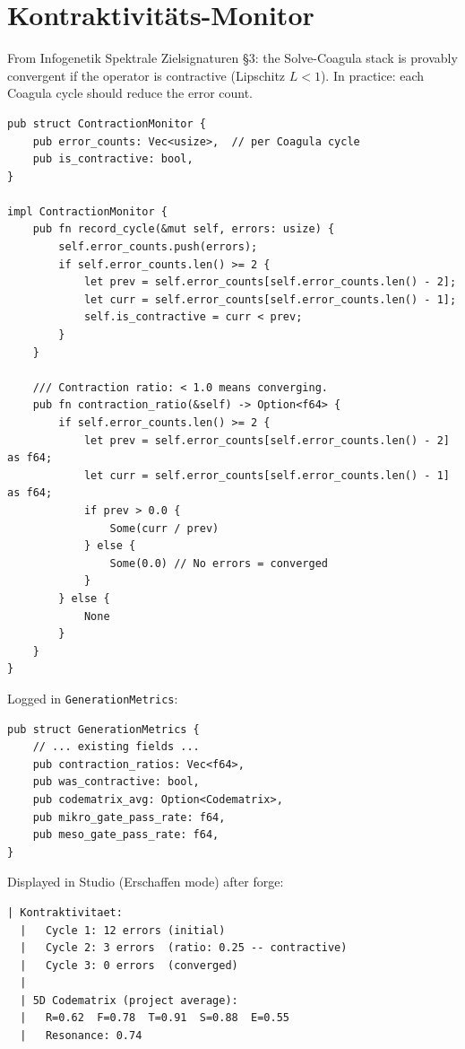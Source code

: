 \documentclass[11pt,a4paper]{article}
\begin{document}
\section{Kontraktivit\"ats-Monitor}
\label{sec:contraction}

From Infogenetik Spektrale Zielsignaturen \S3: the Solve-Coagula 
stack is provably convergent if the operator is contractive 
(Lipschitz $L < 1$). In practice: each Coagula cycle should 
reduce the error count.

\begin{lstlisting}[style=rust]
pub struct ContractionMonitor {
    pub error_counts: Vec<usize>,  // per Coagula cycle
    pub is_contractive: bool,
}

impl ContractionMonitor {
    pub fn record_cycle(&mut self, errors: usize) {
        self.error_counts.push(errors);
        if self.error_counts.len() >= 2 {
            let prev = self.error_counts[self.error_counts.len() - 2];
            let curr = self.error_counts[self.error_counts.len() - 1];
            self.is_contractive = curr < prev;
        }
    }
    
    /// Contraction ratio: < 1.0 means converging.
    pub fn contraction_ratio(&self) -> Option<f64> {
        if self.error_counts.len() >= 2 {
            let prev = self.error_counts[self.error_counts.len() - 2] as f64;
            let curr = self.error_counts[self.error_counts.len() - 1] as f64;
            if prev > 0.0 {
                Some(curr / prev)
            } else {
                Some(0.0) // No errors = converged
            }
        } else {
            None
        }
    }
}
\end{lstlisting}

Logged in \texttt{GenerationMetrics}:

\begin{lstlisting}[style=rust]
pub struct GenerationMetrics {
    // ... existing fields ...
    pub contraction_ratios: Vec<f64>,
    pub was_contractive: bool,
    pub codematrix_avg: Option<Codematrix>,
    pub mikro_gate_pass_rate: f64,
    pub meso_gate_pass_rate: f64,
}
\end{lstlisting}

Displayed in Studio (Erschaffen mode) after forge:

\begin{lstlisting}[style=bash]
  | Kontraktivitaet: 
  |   Cycle 1: 12 errors (initial)
  |   Cycle 2: 3 errors  (ratio: 0.25 -- contractive)
  |   Cycle 3: 0 errors  (converged)
  |
  | 5D Codematrix (project average):
  |   R=0.62  F=0.78  T=0.91  S=0.88  E=0.55
  |   Resonance: 0.74
\end{lstlisting}
\end{document}
